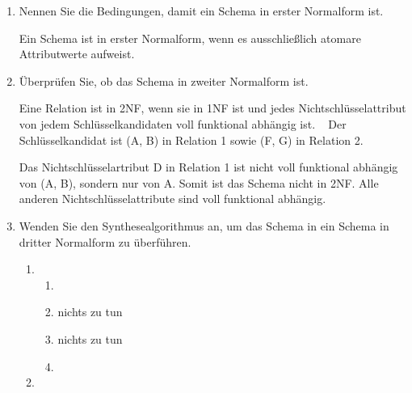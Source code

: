 \documentclass{lehramt-informatik-aufgabe}
\begin{document}
\begin{enumerate}


\item Nennen Sie die Bedingungen, damit ein Schema in erster Normalform
ist.

\begin{liAntwort}
Ein Schema ist in erster Normalform, wenn es ausschließlich atomare
Attributwerte aufweist.
\end{liAntwort}


\item Überprüfen Sie, ob das Schema in zweiter Normalform ist.

\begin{liAntwort}
Eine Relation ist in 2NF, wenn sie in 1NF ist und jedes
Nichtschlüsselattribut von jedem Schlüsselkandidaten voll funktional
abhängig ist.
 
Der Schlüsselkandidat ist (A, B) in Relation 1 sowie (F, G) in Relation
2.

Das Nichtschlüsselartribut D in Relation 1 ist nicht voll funktional
abhängig von (A, B), sondern nur von A. Somit ist das Schema nicht in
2NF. Alle anderen Nichtschlüsselattribute sind voll funktional abhängig.
\end{liAntwort}


\item Wenden Sie den Synthesealgorithmus an, um das Schema in ein Schema
in dritter Normalform zu überführen.

\begin{liAntwort}
\begin{enumerate}
\item {}
\begin{enumerate}
\item {}


\item {}

nichts zu tun

\item {}

nichts zu tun

\item {}


\end{enumerate}
\item {}


\end{enumerate}
\end{liAntwort}
\end{enumerate}
\end{document}
